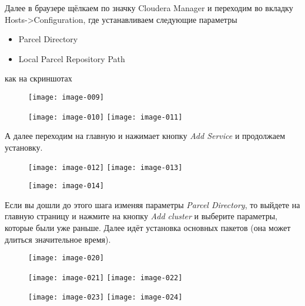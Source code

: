 Далее в браузере щёлкаем по значку Cloudera Manager и переходим во вкладку Hosts->Configuration, где 
устанавливаем следующие параметры
\begin{itemize}
    \item Parcel Directory
    \item Local Parcel Repository Path
\end{itemize}
как на скриншотах

\begin{figure}[ht!]
    \center
    \texttt{[image: image-009]}
\end{figure}

\newpage

\begin{figure}[ht!]
    \center
    \texttt{[image: image-010]}
    \texttt{[image: image-011]}
\end{figure}
А далее переходим на главную и нажимает кнопку \emph{Add Service} и продолжаем установку.

\newpage

\begin{figure}[ht!]
    \center
    \texttt{[image: image-012]}
    \texttt{[image: image-013]}
\end{figure}

\newpage

\begin{figure}[ht!]
    \center
    \texttt{[image: image-014]}
\end{figure}

Если вы дошли до этого шага изменяя параметры \emph{Parcel Directory}, то выйдете на главную страницу и 
нажмите на кнопку \emph{Add cluster} и выберите параметры, которые были уже раньше. Далее идёт установка 
основных пакетов (она может длиться значительное время).

\begin{figure}[ht!]
    \center
    \texttt{[image: image-020]}
\end{figure}

\newpage

\begin{figure}[ht!]
    \center
    \texttt{[image: image-021]}
    \texttt{[image: image-022]}
\end{figure}


\newpage

\begin{figure}[ht!]
    \center
    \texttt{[image: image-023]}
    \texttt{[image: image-024]}
\end{figure}

